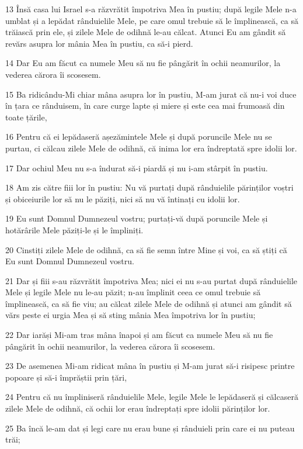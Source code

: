 \par 13 Însă casa lui Israel s-a răzvrătit împotriva Mea în pustiu; după legile Mele n-a umblat și a lepădat rânduielile Mele, pe care omul trebuie să le împlinească, ca să trăiască prin ele, și zilele Mele de odihnă le-au călcat. Atunci Eu am gândit să revărs asupra lor mânia Mea în pustiu, ca să-i pierd.
\par 14 Dar Eu am făcut ca numele Meu să nu fie pângărit în ochii neamurilor, la vederea cărora îi scosesem.
\par 15 Ba ridicându-Mi chiar mâna asupra lor în pustiu, M-am jurat că nu-i voi duce în țara ce rânduisem, în care curge lapte și miere și este cea mai frumoasă din toate țările,
\par 16 Pentru că ei lepădaseră așezămintele Mele și după poruncile Mele nu se purtau, ci călcau zilele Mele de odihnă, că inima lor era îndreptată spre idolii lor.
\par 17 Dar ochiul Meu nu s-a îndurat să-i piardă și nu i-am stârpit în pustiu.
\par 18 Am zis către fiii lor în pustiu: Nu vă purtați după rânduielile părinților voștri și obiceiurile lor să nu le păziți, nici să nu vă întinați cu idolii lor.
\par 19 Eu sunt Domnul Dumnezeul vostru; purtați-vă după poruncile Mele și hotărârile Mele păziți-le și le împliniți.
\par 20 Cinstiți zilele Mele de odihnă, ca să fie semn între Mine și voi, ca să știți că Eu sunt Domnul Dumnezeul vostru.
\par 21 Dar și fiii s-au răzvrătit împotriva Mea; nici ei nu s-au purtat după rânduielile Mele și legile Mele nu le-au păzit; n-au împlinit ceea ce omul trebuie să împlinească, ca să fie viu; au călcat zilele Mele de odihnă și atunci am gândit să vărs peste ei urgia Mea și să sting mânia Mea împotriva lor în pustiu;
\par 22 Dar iarăși Mi-am tras mâna înapoi și am făcut ca numele Meu să nu fie pângărit în ochii neamurilor, la vederea cărora îi scosesem.
\par 23 De asemenea Mi-am ridicat mâna în pustiu și M-am jurat să-i risipesc printre popoare și să-i împrăștii prin țări,
\par 24 Pentru că nu împliniseră rânduielile Mele, legile Mele le lepădaseră și călcaseră zilele Mele de odihnă, că ochii lor erau îndreptați spre idolii părinților lor.
\par 25 Ba încă le-am dat și legi care nu erau bune și rânduieli prin care ei nu puteau trăi;

